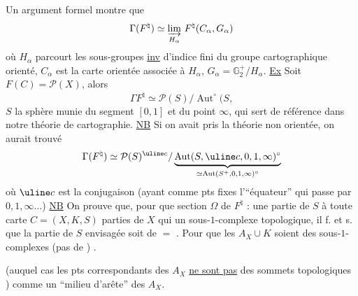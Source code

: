 Un argument  formel montre que
\[
\Gamma(F^\natural)\simeq\underset{H_\alpha}{\varinjlim}\ F^\natural(C_\alpha,G_\alpha)
\]
où $H_\alpha$ parcourt les sous-groupes \uline{inv} d’indice fini du groupe cartographique orienté, $C_\alpha$ est la carte orientée associée à $H_\alpha$, $G_\alpha=\mathbb G_2^+/H_\alpha$.
\uline{Ex} Soit $F(C)=\mathcal P(X)$, alors
\[
\Gamma F^\natural\simeq\mathcal P(S)/\operatorname{Aut}^\circ(S,
\]
$S$  la sphère munie du segment $[0,1]$ et du point $\infty$,
 qui sert de référence dans notre théorie de cartographie.
\uline{NB} Si on avait pris la théorie non orientée, on aurait trouvé
\[
\Gamma(F^\natural)\simeq\mathcal P(S)^{\uline c}/
\underbrace{\operatorname{Aut}(S,\uline c,0,1,\infty)^\circ}_{\simeq\operatorname{Aut}(S^+,0,1,\infty)^\circ}
\]
où $\uline c$ est la conjugaison (ayant comme pts fixes l’``équateur'' qui passe par $0,1,\infty\ldots$)
\uline{NB} On prouve  que, pour que  section $\Omega$ de $F^\natural$ : une partie  de $S$   à toute carte $C=(X,K,S)$  parties  de $X$ qui  un sous-$1$-complexe topologique, il f. et s. que la partie de $S$ envisagée soit de $=$ .
Pour que les $A_X\cup K$ soient des sous-$1$-complexes (pas de ) \unsure{cf] et 1|si] et 1}.

(auquel cas les pts correspondants des
$A_X$ \uline{ne sont pas} des sommets topologiques
\unsure{\ldots})   
 comme un ``milieu
d'arête'' des $A_X$.

